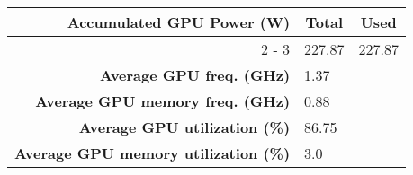 \begin{tabular}{|r|c|c|}%
\hline%
\multirow{2}{*}{\textbf{Accumulated GPU Power (W)}}&\textbf{Total}&\textbf{Used}\\%
\cline{2%
-%
3}%
&227.87&227.87\\%
\hline%
\textbf{Average GPU freq. (GHz)}&\multicolumn{2}{l|}{1.37}\\%
\hline%
\textbf{Average GPU memory freq. (GHz)}&\multicolumn{2}{l|}{0.88}\\%
\hline%
\textbf{Average GPU utilization (\%)}&\multicolumn{2}{l|}{86.75}\\%
\hline%
\textbf{Average GPU memory utilization (\%)}&\multicolumn{2}{l|}{3.0}\\%
\hline%
\end{tabular}